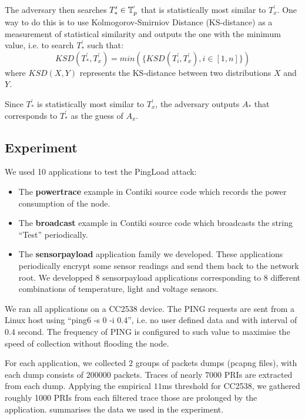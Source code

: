 \begin{description}
	The adversary then searches $T^{\prime}_* \in \mathbb{T}^{`}_p$ that is statistically most similar to $T^{\prime}_x$. One way to do this is to use Kolmogorov-Smirniov Distance (KS-distance) as a measurement of statistical similarity and outputs the one with the minimum value, i.e. to search $T^{\prime}_*$ such that:
	\begin{equation}
		KSD( T^{\prime}_*, T^{\prime}_x) = min(\{KSD(T^{\prime}_i, T^{\prime}_x), i \in [1,n]\})
	\end{equation}
	where $KSD(X, Y)$ represents the KS-distance between two distributions $X$ and $Y$.
	
	Since $T^{\prime}_*$ is statistically most similar to $T^{\prime}_x$, the adversary outputs $A_*$ that corresponds to $T^{\prime}_*$ as the guess of $A_x$.
\end{description}

\subsection{Experiment}

We used 10 applications to test the PingLoad attack:
\begin{itemize}
	\item The \textbf{powertrace} example in Contiki source code which records the power consumption of the node.
	\item The \textbf{broadcast} example in Contiki source code which broadcasts the string ``Test'' periodically.
	\item The \textbf{sensorpayload} application family we developed. These applications periodically encrypt some sensor readings and send them back to the network root. We developped $8$ sensorpayload applications corresponding to $8$ different combinations of temperature, light and voltage sensors.
\end{itemize}

We  ran all applications on a CC2538 device. The PING requests are sent from a Linux host using ``ping6 -s 0 -i 0.4'', i.e. no user defined data and with interval of $0.4$ second. The frequency of PING is configured to such value to maximise the speed of collection without flooding the node.

For each application, we collected $2$ groups of packets dumps (pcapng files), with each dump consists of $200000$ packets. Traces of nearly $7000$ PRIs are extracted from each dump. Applying the empirical $11$ms threshold for CC2538, we gathered roughly 1000 PRIs from each filtered trace those are prolonged by the application.  summarises the data we used in the experiment.

